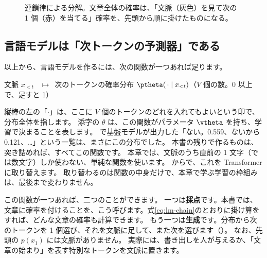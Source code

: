 \begin{figure}[tbp]
\centering
{}
\caption{連鎖律による分解。文章全体の確率は、「文脈（灰色）を見て次の 1 個（赤）を当てる」確率を、先頭から順に掛けたものになる。}
\label{fig:lm-chain}
\end{figure}

\subsection*{言語モデルは「次トークンの予測器」である}

以上から、言語モデルを作るには、次の関数が一つあれば足ります。
\begin{center}
文脈 $x_{<t}$ \ $\longmapsto$\ 次のトークンの確率分布 $\ptheta(\,\cdot\mid x_{<t})$（$V$ 個の数。0 以上で、足すと 1）
\end{center}
縦棒の左の「$\cdot$」は、ここに $V$ 個のトークンのどれを入れてもよいという印で、分布全体を指します。
添字の $\theta$ は、この関数がパラメータ $\vtheta$ を持ち、学習で決まることを表します。
で基盤モデルが出力した「ない。0.559、ないから 0.121、\dots」という一覧は、まさにこの分布でした。
本書の残りで作るものは、突き詰めれば、すべてこの関数です。
本章では、文脈のうち直前の 1 文字（では数文字）しか使わない、単純な関数を使います。
からで、これを Transformer に取り替えます。
取り替わるのは関数の中身だけで、本章で学ぶ学習の枠組みは、最後まで変わりません。

この関数が一つあれば、二つのことができます。
一つは\textbf{採点}です。本書では、文章に確率を付けることを、こう呼びます。式\eqref{eq:lm-chain}のとおりに掛け算をすれば、どんな文章の確率も計算できます。
もう一つは\textbf{生成}です。分布から次のトークンを 1 個選び、それを文脈に足して、また次を選びます（）。
なお、先頭の $p(x_1)$ には文脈がありません。
実際には、書き出しを人が与えるか、「文章の始まり」を表す特別なトークンを文脈に置きます。

